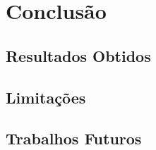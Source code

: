 \chapter{Conclusão}

\section{Resultados Obtidos}


\section{Limitações}

\section{Trabalhos Futuros}